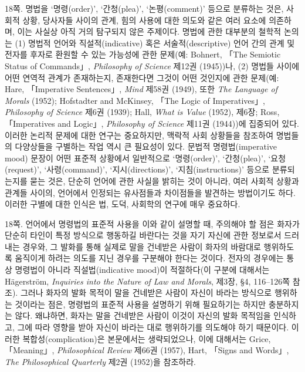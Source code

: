 {\footnotesize
\noteentry 18쪽.  명법을
‘명령(order)’, ‘간청(plea)’, ‘논평(comment)’ 등으로 분류하는 것은,
사회적 상황, 당사자들 사이의 관계, 힘의 사용에 대한 의도와 같은 여러
요소에 의존하며, 이는 사실상 아직 거의 탐구되지 않은 주제이다. 명법에
관한 대부분의 철학적 논의는 (1) 명법적 언어와 직설적(indicative) 혹은
서술적(descriptive) 언어 간의 관계 및 전자를 후자로 환원할 수 있는
가능성에 관한 문제(예: Bohnert, 「The Semiotic Status of Commands」,
\emph{Philosophy of Science} 제12권 (1945))나, (2) 명법들 사이에 어떤
연역적 관계가 존재하는지, 존재한다면 그것이 어떤 것인지에 관한 문제(예:
Hare, 「Imperative Sentences」, \emph{Mind} 제58권 (1949), 또한
\emph{The Language of Morals} (1952); Hofstadter and McKinsey, 「The
Logic of Imperatives」, \emph{Philosophy of Science} 제6권 (1939); Hall,
\emph{What is Value} (1952), 제6장; Ross, 「Imperatives and Logic」,
\emph{Philosophy of Science} 제11권 (1944))에 집중되어 있다. 이러한
논리적 문제에 대한 연구는 중요하지만, 맥락적 사회 상황들을 참조하여
명법들의 다양상들을 구별하는 작업 역시 큰 필요성이 있다. 문법적
명령법(imperative mood) 문장이 어떤 표준적 상황에서 일반적으로
‘명령(order)’, ‘간청(plea)’, ‘요청(request)’, ‘사령(command)’,
‘지시(directions)’, ‘지침(instructions)’ 등으로 분류되는지를 묻는 것은,
단순히 언어에 관한 사실을 밝히는 것이 아니라, 여러 사회적 상황과 관계들
사이의, 언어에서 인정되는 유사점들과 차이점들을 발견하는 방법이기도
하다. 이러한 구별에 대한 인식은 법, 도덕, 사회학의 연구에 매우 중요하다.

\noteentry 18쪽.  언어에서 명령법의 표준적 사용을 이와 같이 설명할
때, 주의해야 할 점은 화자가 단순히 타인이 특정 방식으로 행동하길
바란다는 것을 자기 자신에 관한 정보로서 드러내는 경우와, 그 발화를 통해
실제로 말을 건네받은 사람이 화자의 바람대로 행위하도록 움직이게 하려는
의도를 지닌 경우를 구분해야 한다는 것이다. 전자의 경우에는 통상 명령법이
아니라 직설법(indicative mood)이 적절하다(이 구분에 대해서는 Hägerström,
\emph{Inquiries into the Nature of Law and Morals}, 제3장, §4,
116--126쪽 참조). 그러나 화자의 발화 목적이 말을 건네받은 사람이 자신이
바라는 방식으로 행위하는 것이라는 점은, 명령법의 표준적 사용을 설명하기
위해 필요하기는 하지만 충분하지는 않다. 왜냐하면, 화자는 말을 건네받은
사람이 이것이 자신의 발화 목적임을 인식하고, 그에 따라 영향을 받아
자신이 바라는 대로 행위하기를 의도해야 하기 때문이다. 이러한
복합성(complication)은 본문에서는 생략되었으나, 이에 대해서는 Grice,
「Meaning」, \emph{Philosophical Review} 제66권 (1957), Hart, 「Signs
and Words」, \emph{The Philosophical Quarterly} 제2권 (1952)을 참조하라.

}
